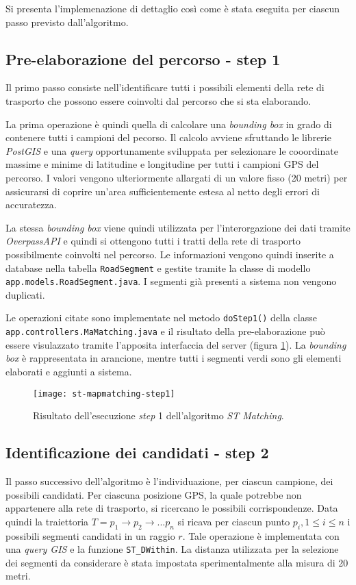 Si presenta l'implemenazione di dettaglio così come è stata eseguita per ciascun passo previsto dall'algoritmo.

\subsection{Pre-elaborazione del percorso - step 1}
Il primo passo consiste nell'identificare tutti i possibili elementi della rete di trasporto che possono essere coinvolti dal percorso che si sta elaborando.

La prima operazione è quindi quella di calcolare una \emph{bounding box} in grado di contenere tutti i campioni del pecorso. Il calcolo avviene sfruttando le librerie \emph{PostGIS} e una \emph{query} opportunamente sviluppata per selezionare le cooordinate massime e minime di latitudine e longitudine per tutti i campioni GPS del percorso. I valori vengono ulteriormente allargati di un valore fisso (20 metri) per assicurarsi di coprire un'area sufficientemente estesa al netto degli errori di accuratezza.

La stessa \emph{bounding box} viene quindi utilizzata per l'interorgazione dei dati tramite \emph{OverpassAPI} e quindi si ottengono tutti i tratti della rete di trasporto possibilmente coinvolti nel percorso. Le informazioni vengono quindi inserite a database nella tabella \texttt{RoadSegment} e gestite tramite la classe di modello \texttt{app.\-models.\-RoadSegment.java}. I segmenti già presenti a sistema non vengono duplicati. 

Le operazioni citate sono implementate nel metodo \texttt{doStep1()} della classe \texttt{app.\-controllers.\-MaMatching.java} e il risultato della pre-elaborazione può essere visulazzato tramite l'apposita interfaccia del server (figura \ref{fig:st-mapmatching-step1}). La \emph{bounding box} è rappresentata in arancione, mentre tutti i segmenti verdi sono gli elementi elaborati e aggiunti a sistema.

\begin{figure}[h]
  \centering
  \texttt{[image: st-mapmatching-step1]}
  \caption{\footnotesize{Risultato dell'esecuzione \emph{step} 1 dell'algoritmo \emph{ST Matching}.}}
  \label{fig:st-mapmatching-step1}
\end{figure}

\subsection{Identificazione dei candidati - step 2}
Il passo successivo dell'algoritmo è l'individuazione, per ciascun campione, dei possibili candidati. Per ciascuna posizione GPS, la quale potrebbe non appartenere alla rete di trasporto, si ricercano le possibili corrispondenze. Data quindi la traiettoria $T=p_1 \rightarrow p_2 \rightarrow ... p_n$ si ricava per ciascun punto $p_i, 1 \leq i \leq n$ i possibili segmenti candidati in un raggio $r$. Tale operazione è implementata con una \emph{query GIS} e la funzione \texttt{ST\_DWithin}. La distanza utilizzata per la selezione dei segmenti da considerare è stata impostata sperimentalmente alla misura di 20 metri. 

